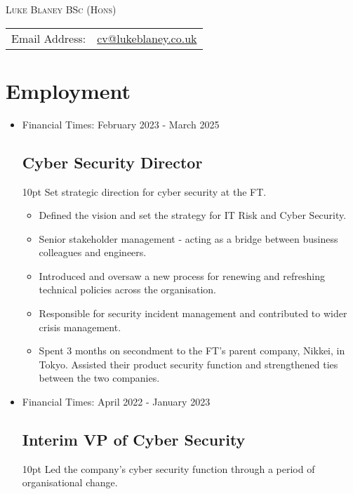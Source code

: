 \documentclass[a4paper]{article}
\newenvironment{detail}{\begin{adjustwidth}{10pt}{}}{\end{adjustwidth}}
\begin{document}
\begin{center}\textsc{\LARGE Luke Blaney BSc (Hons)}\end{center}

\begin{tabular}{ l l }

Email Address: & \href{mailto:cv@lukeblaney.co.uk}{cv@lukeblaney.co.uk}\\

\end{tabular}

\section*{Employment}

\begin{itemize}


\item Financial Times: February 2023 - March 2025
\subsection*{Cyber Security Director}
\begin{detail}
Set strategic direction for cyber security at the FT.

\begin{itemize}
	\item Defined the vision and set the strategy for IT Risk and Cyber Security.
	\item Senior stakeholder management - acting as a bridge between business colleagues and engineers.
	\item Introduced and oversaw a new process for renewing and refreshing technical policies across the organisation.
	\item Responsible for security incident management and contributed to wider crisis management.
	\item Spent 3 months on secondment to the FT's parent company, Nikkei, in Tokyo.  Assisted their product security function and strengthened ties between the two companies.
\end{itemize}
\end{detail}

\item Financial Times: April 2022 - January 2023
\subsection*{Interim VP of Cyber Security}
\begin{detail}
Led the company's cyber security function through a period of organisational change.


\end{detail}
\end{itemize}
\end{document}
